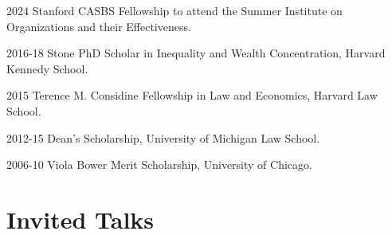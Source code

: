 \documentclass[12pt,letterpaper]{report}
\begin{document}
    \begin{tablist}
        \item[2024] \tab{} Stanford CASBS Fellowship to attend the Summer Institute on Organizations and their Effectiveness.
    \item[2016-18] \tab{}Stone PhD Scholar in Inequality and Wealth Concentration, Harvard Kennedy School.
    \item[2015] \tab{}Terence M. Considine Fellowship in Law and Economics, Harvard Law School.
    \item[2012-15] \tab{}Dean's Scholarship, University of Michigan Law School.
    \item[2006-10] \tab{}Viola Bower Merit Scholarship, University of Chicago.
    \end{tablist}

	

    \section*{Invited Talks}
\end{document}
